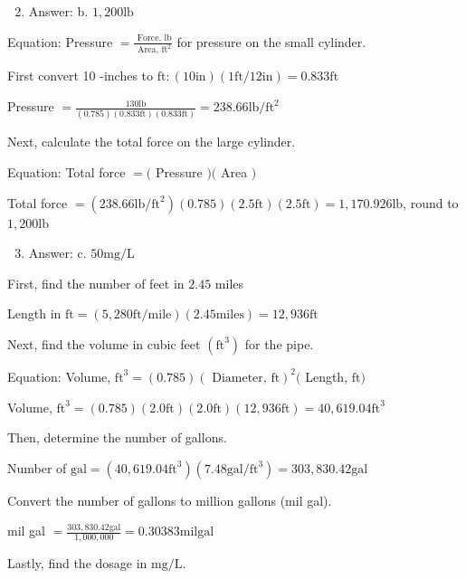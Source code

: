 \documentclass[10pt]{article}
\begin{document}
\begin{enumerate}
  \setcounter{enumi}{1}
  \item Answer: b. $1,200 \mathrm{lb}$
\end{enumerate}

Equation: Pressure $=\frac{\text { Force, } \mathrm{lb}}{\text { Area, } \mathrm{ft}^{2}}$ for pressure on the small cylinder.

First convert 10 -inches to $\mathrm{ft}:(10 \mathrm{in})(1 \mathrm{ft} / 12 \mathrm{in})=0.833 \mathrm{ft}$

Pressure $=\frac{130 \mathrm{lb}}{(0.785)(0.833 \mathrm{ft})(0.833 \mathrm{ft})}=238.66 \mathrm{lb} / \mathrm{ft}^{2}$

Next, calculate the total force on the large cylinder.

Equation: Total force $=($ Pressure $)($ Area $)$

Total force $=\left(238.66 \mathrm{lb} / \mathrm{ft}^{2}\right)(0.785)(2.5 \mathrm{ft})(2.5 \mathrm{ft})=1,170.926 \mathrm{lb}$, round to $1,200 \mathrm{lb}$

\begin{enumerate}
  \setcounter{enumi}{2}
  \item Answer: c. $50 \mathrm{mg} / \mathrm{L}$
\end{enumerate}

First, find the number of feet in $2.45$ miles

Length in $\mathrm{ft}=(5,280 \mathrm{ft} / \mathrm{mile})(2.45 \mathrm{miles})=12,936 \mathrm{ft}$

Next, find the volume in cubic feet $\left(\mathrm{ft}^{3}\right)$ for the pipe.

Equation: Volume, $\mathrm{ft}^{3}=(0.785)(\text { Diameter, } \mathrm{ft})^{2}($ Length, $\mathrm{ft})$

Volume, $\mathrm{ft}^{3}=(0.785)(2.0 \mathrm{ft})(2.0 \mathrm{ft})(12,936 \mathrm{ft})=40,619.04 \mathrm{ft}^{3}$

Then, determine the number of gallons.

Number of $\mathrm{gal}=\left(40,619.04 \mathrm{ft}^{3}\right)\left(7.48 \mathrm{gal} / \mathrm{ft}^{3}\right)=303,830.42 \mathrm{gal}$

Convert the number of gallons to million gallons (mil gal).

mil gal $=\frac{303,830.42 \mathrm{gal}}{1,000,000}=0.30383 \mathrm{mil} \mathrm{gal}$

Lastly, find the dosage in $\mathrm{mg} / \mathrm{L}$.
\end{document}

